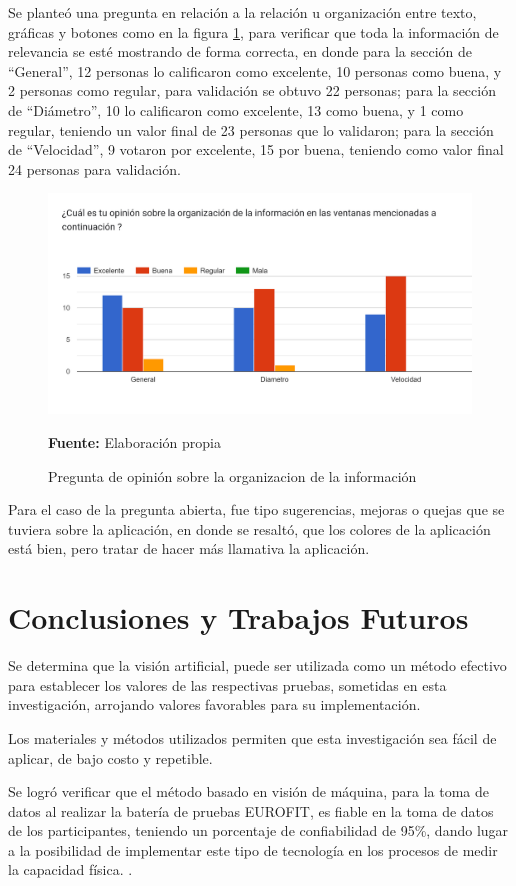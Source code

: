 \documentclass[12pt,twocolumn,a4paper]{article}
\begin{document}
Se planteó una pregunta en relación a la relación u organización entre texto, gráficas y botones como en la figura \ref{Encuesta8}, para verificar que toda la información de relevancia se esté mostrando de forma correcta, en donde para la sección de “General”, 12 personas lo calificaron como excelente, 10 personas como buena, y 2 personas como regular, para validación se obtuvo 22 personas; para la sección de “Diámetro”, 10 lo calificaron como excelente, 13 como  buena, y 1 como regular, teniendo un valor final de 23 personas que lo validaron; para la sección de “Velocidad”, 9 votaron por excelente, 15 por  buena, teniendo como valor final 24 personas para validación. 

\begin{figure}
	\centering
	\includegraphics[scale=0.3]{Encuesta8.png}
	\caption{Pregunta de opinión sobre la organizacion de la información } \textbf{Fuente:} Elaboración propia
	\label{Encuesta8}
\end{figure}

Para el caso de la pregunta abierta, fue tipo sugerencias, mejoras o quejas que se tuviera sobre la aplicación, en donde se resaltó, que los colores de la aplicación está bien, pero tratar de hacer más llamativa la aplicación.

\section{Conclusiones y Trabajos Futuros}
Se determina que la visión artificial, puede ser utilizada como un método efectivo para establecer los valores de las respectivas pruebas, sometidas en esta investigación, arrojando valores favorables para su implementación.

Los materiales y métodos utilizados permiten que esta investigación sea fácil de aplicar, de bajo costo  y repetible.

Se logró verificar que el método basado en visión de máquina, para la toma de datos al realizar la batería de pruebas EUROFIT, es fiable en la toma de datos de los participantes, teniendo un porcentaje de confiabilidad de 95\%, dando lugar a la posibilidad de implementar este tipo de tecnología en los procesos de medir la capacidad física.  
 .



\end{document}
